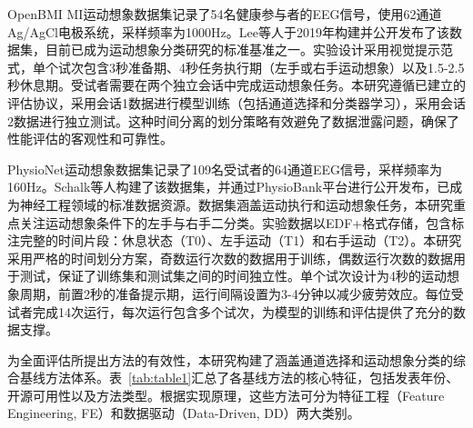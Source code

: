 OpenBMI MI运动想象数据集记录了54名健康参与者的EEG信号，使用62通道Ag/AgCl电极系统，采样频率为1000Hz。Lee等人于2019年构建并公开发布了该数据集，目前已成为运动想象分类研究的标准基准之一。实验设计采用视觉提示范式，单个试次包含3秒准备期、4秒任务执行期（左手或右手运动想象）以及1.5-2.5秒休息期。受试者需要在两个独立会话中完成运动想象任务。本研究遵循已建立的评估协议\cite{lee2025neuroxai}，采用会话1数据进行模型训练（包括通道选择和分类器学习），采用会话2数据进行独立测试。这种时间分离的划分策略有效避免了数据泄露问题，确保了性能评估的客观性和可靠性。

PhysioNet运动想象数据集记录了109名受试者的64通道EEG信号，采样频率为160Hz。Schalk等人构建了该数据集，并通过PhysioBank平台进行公开发布\cite{goldberger_physiobank_2000}，已成为神经工程领域的标准数据资源。数据集涵盖运动执行和运动想象任务，本研究重点关注运动想象条件下的左手与右手二分类。实验数据以EDF+格式存储，包含标注完整的时间片段：休息状态（T0）、左手运动（T1）和右手运动（T2）。本研究采用严格的时间划分方案，奇数运行次数的数据用于训练，偶数运行次数的数据用于测试，保证了训练集和测试集之间的时间独立性。单个试次设计为4秒的运动想象周期，前置2秒的准备提示期，运行间隔设置为3-4分钟以减少疲劳效应。每位受试者完成14次运行，每次运行包含多个试次，为模型的训练和评估提供了充分的数据支撑。

为全面评估所提出方法的有效性，本研究构建了涵盖通道选择和运动想象分类的综合基线方法体系。表~\ref{tab:table1}汇总了各基线方法的核心特征，包括发表年份、开源可用性以及方法类型。根据实现原理，这些方法可分为特征工程（Feature Engineering, FE）和数据驱动（Data-Driven, DD）两大类别。



